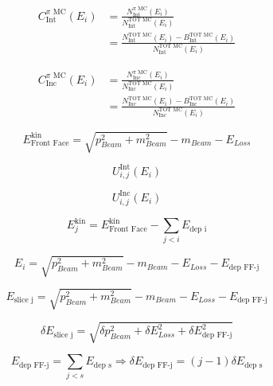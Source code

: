 \documentclass[letterpaper,12pt]{yalephd}
\begin{document}
\begin{align}
C^{\text{$\pi$ MC}}_{\text{Int}} (E_{i}) &= \frac{N^{\text{$\pi$ MC}}_{\text{Int}} (E_{i})}{N^{\text{TOT MC}}_{\text{Int}} (E_{i})}\\
&= \frac{ N^{\text{TOT MC}}_{\text{Int}} (E_{i}) - B^{\text{TOT MC}}_{\text{Int}} (E_{i}) }{N^{\text{TOT MC}}_{\text{Int}} (E_{i})}
\end{align}


\begin{align}
C^{\text{$\pi$ MC}}_{\text{Inc}} (E_{i}) &= \frac{N^{\text{$\pi$ MC}}_{\text{Inc}} (E_{i})}{N^{\text{TOT MC}}_{\text{Inc}} (E_{i})}\\
&= \frac{ N^{\text{TOT MC}}_{\text{Inc}} (E_{i}) - B^{\text{TOT MC}}_{\text{Inc}} (E_{i}) }{N^{\text{TOT MC}}_{\text{Inc}} (E_{i})}
\end{align}


\begin{equation}
E^{\text{kin}}_{\text{Front Face}} = \sqrt{p_{Beam}^2 + m_{Beam}^2} - m_{Beam} - E_{Loss} 
\end{equation}


\begin{equation}
U^\text{Int} _{i, j} (E_i) 
\end{equation}

\begin{equation}
U^\text{Inc} _{i, j} (E_i) 
\end{equation}


\begin{equation}
E^\text{kin}_j = E^{\text{kin}}_{\text{Front Face}} - \sum_{j<i} E_{\text{dep i}} 
\end{equation}


\begin{equation}
E_{i} = \sqrt{p_{Beam}^2 + m_{Beam}^2} - m_{Beam} - E_{Loss} - E_{\text{dep FF-j}}
\end{equation}


\begin{equation}
E_{\text{slice j}} = \sqrt{p_{Beam}^2 + m_{Beam}^2} - m_{Beam} - E_{Loss} - E_{\text{dep FF-j}}
\end{equation}


\begin{equation}
\delta E_{\text{slice j}} = \sqrt{\delta p_{Beam}^2 + \delta E_{Loss}^2 +  \delta  E_{\text{dep FF-j}}^2}
\end{equation}

\begin{equation}
E_{\text{dep FF-j}} = \sum_{j<s} E_{\text{dep s}}  \Rightarrow \delta E_{\text{dep FF-j}} = (j -1) \delta E_{\text{dep s}}
\end{equation}
\end{document}

